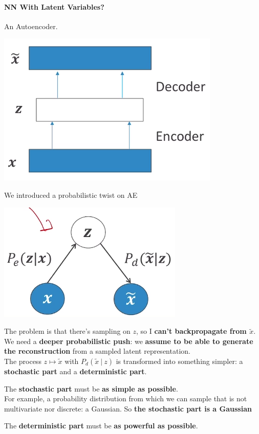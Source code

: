 \documentclass[10pt]{report}
\begin{document}
\paragraph{NN With Latent Variables?} An Autoencoder.
\begin{center}
	\includegraphics[scale=0.5]{140.png}
\end{center}
We introduced a probabilistic twist on AE
\begin{center}
	\includegraphics[scale=0.5]{141.png}
\end{center}
The problem is that there's sampling on $z$, so I \textbf{can't backpropagate from $\tilde{x}$}.\\
We need a \textbf{deeper probabilistic push}: we \textbf{assume to be able to generate the reconstruction} from a sampled latent representation.\\
The process $z\mapsto\tilde{x}$ with $P_d(\tilde{x}\:|\:z)$ is transformed into something simpler: a \textbf{stochastic part} and a \textbf{deterministic part}.
\begin{list}{}{}
	\item The \textbf{stochastic part} must be \textbf{as simple as possible}.\\
	For example, a probability distribution from which we can sample that is not multivariate nor discrete: a Gaussian. So \textbf{the stochastic part is a Gaussian}
	\item The \textbf{deterministic part} must be \textbf{as powerful as possible}.
\end{list}
\end{document}

